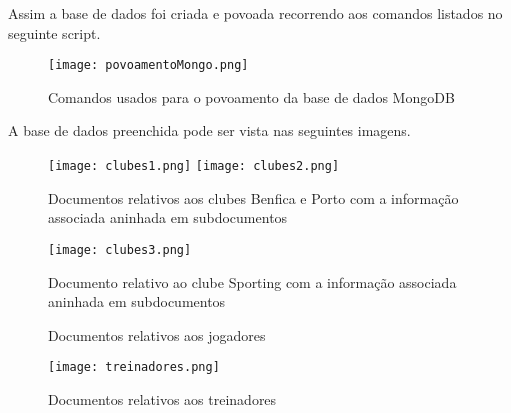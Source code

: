 \par Assim a base de dados foi criada e povoada recorrendo aos comandos listados no seguinte script. 

\begin{figure}[H]

  \centering
  \captionsetup{justification=centering}

  \texttt{[image: povoamentoMongo.png]}
  
  \caption {Comandos usados para o povoamento da base de dados MongoDB}

  \label{fig:povoamento}
\end{figure}


\par A base de dados preenchida pode ser vista nas seguintes imagens.

\begin{figure}[H]

  \centering
  \captionsetup{justification=centering}

  \texttt{[image: clubes1.png]}
  \texttt{[image: clubes2.png]}
  \caption {Documentos relativos aos clubes Benfica e Porto com a informação associada aninhada em subdocumentos}
  
  \vspace{0.5cm}
  \texttt{[image: clubes3.png]}
  
  \caption {Documento relativo ao clube Sporting com a informação associada aninhada em subdocumentos}

  \label{fig:povoamento2}
\end{figure}

\begin{figure}[H]

  \centering
  \qquad
  \qquad
  \qquad
  
  \caption {Documentos relativos aos jogadores}

  \label{fig:povoamento}
\end{figure}


\begin{figure}[H]

  \centering
  \captionsetup{justification=centering}

  \texttt{[image: treinadores.png]}
  
  \caption {Documentos relativos aos treinadores}

  \label{fig:povoamento}
\end{figure}









